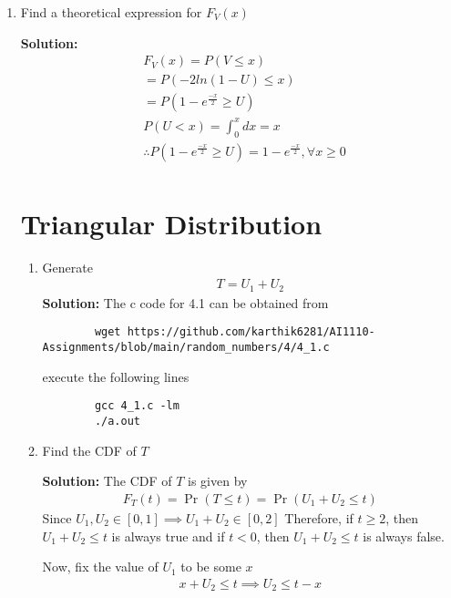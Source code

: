 \documentclass[journal,12pt,twocolumn]{IEEEtran}
\newcommand{\solution}{\noindent \textbf{Solution: }}
\providecommand{\pr}[1]{\ensuremath{\Pr\left(#1\right)}}
\numberwithin{equation}{section}
\renewcommand\thesection{\arabic{section}}
\begin{document}
\begin{enumerate}[label=\thesection.\arabic*,ref=\thesection.\theenumi]
	\item Find a theoretical expression for $F_V(x)$
	
	\solution \begin{align}
 &F_{V}(x)=P(V \leq x)\\
 &=P(-2 ln(1-U) \leq x)\\
 &=P(1-e^{\frac{-x}{2}} \geq U)\\
 &P(U<x)=\int_{0}^{x} dx=x\\
 &\therefore P(1-e^{\frac{-x}{2}} \geq U)=1-e^{\frac{-x}{2}}, \forall x\geq 0 \\ 
 \nonumber
 \end{align}
	
	\section{Triangular Distribution}
	\begin{enumerate}[label=\thesection.\arabic*,ref=\thesection.\theenumi]
	\item Generate 
	\begin{align}
		T = U_1+U_2
	\end{align}
	\solution The c code for 4.1 can be obtained from
	\begin{lstlisting}
		wget https://github.com/karthik6281/AI1110-Assignments/blob/main/random_numbers/4/4_1.c
	\end{lstlisting}
	execute the following lines
	\begin{lstlisting}
		gcc 4_1.c -lm
		./a.out
	\end{lstlisting}
	
	\item Find the CDF of $T$
	
	\solution The CDF of $T$ is given by
	\begin{align}
		F_T(t) = \pr{T \le t} = \pr{U_1 + U_2 \le t}	
	\end{align}		
	Since $U_1, U_2 \in [0,1] \implies U_1 + U_2 \in [0,2]$
	Therefore, if $t \ge 2$, then $U_1 + U_2 \le t$ is always true and if $t < 0$, then $U_1 + U_2 \le t$ is always false.
	
	Now, fix the value of $U_1$ to be some $x$
	\begin{align}
		x + U_2 \le t \implies U_2 \le t - x
	\end{align}
	

\end{enumerate}
\end{enumerate}
\end{document}
